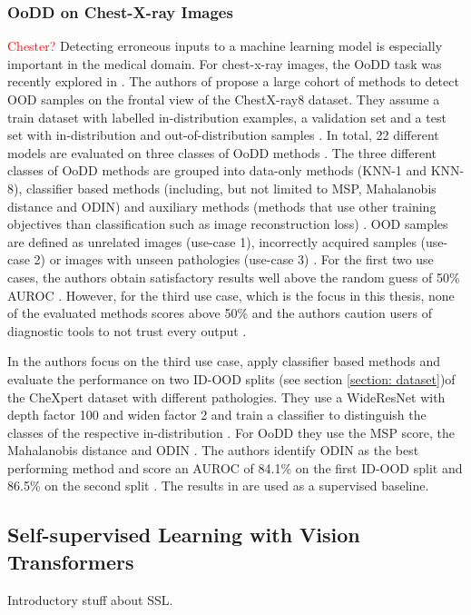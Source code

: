 \subsubsection*{OoDD on Chest-X-ray Images}
\textcolor{red}{Chester?}
Detecting erroneous inputs to a machine learning model is especially important in the medical domain.
For chest-x-ray images, the OoDD task was recently explored in \citep{Cao2020,Berger2021}.
The authors of \citep{Cao2020} propose a large cohort of methods to detect OOD samples on the frontal view of the ChestX-ray8 \citep{Wang2017} dataset.
They assume a train dataset with labelled in-distribution examples, a validation set and a test set with in-distribution and out-of-distribution samples \citep{Cao2020}.
In total, 22 different models are evaluated on three classes of OoDD methods \citep{Cao2020}.
The three different classes of OoDD methods are grouped into data-only methods (KNN-1 and KNN-8), classifier based methods (including, but not limited to MSP, Mahalanobis distance and ODIN) and auxiliary methods (methods that use other training objectives than classification such as image reconstruction loss) \citep{Cao2020}.
OOD samples are defined as unrelated images (use-case 1), incorrectly acquired samples (use-case 2) or images with unseen pathologies (use-case 3) \citep{Cao2020}.
For the first two use cases, the authors obtain satisfactory results well above the random guess of 50\% AUROC \citep{Cao2020}.
However, for the third use case, which is the focus in this thesis, none of the evaluated methods scores above 50\% and the authors caution users of diagnostic tools to not trust every output \citep{Cao2020}.
\par
In \citep{Berger2021} the authors focus on the third use case, apply classifier based methods and evaluate the performance on two ID-OOD splits (see section \ref{section: dataset})of the CheXpert dataset \citep{Irvin2019} with different pathologies.
They use a WideResNet \citep{Zagoruyko2016} with depth factor 100 and widen factor 2 and train a classifier to distinguish the classes of the respective in-distribution \citep{Berger2021}.
For OoDD they use the MSP score, the Mahalanobis distance and ODIN \citep{Berger2021}.
The authors identify ODIN as the best performing method and score an AUROC of 84.1\% on the first ID-OOD split and 86.5\% on the second split \citep{Berger2021}.
The results in \citep{Berger2021} are used as a supervised baseline.
\par
\subsection{Self-supervised Learning with Vision Transformers}
\label{section: SSL}
Introductory stuff about SSL.
